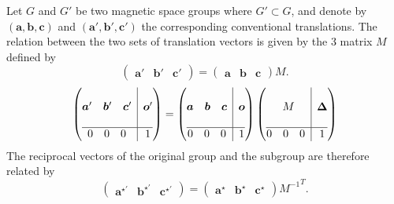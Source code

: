 \documentclass[12pt, a4paper]{article}
\begin{document}
Let $G$ and $G'$ be two magnetic space groups where $G'\subset G$, and denote by $(\bm{a},\bm{b},\bm{c})$ and $(\bm{a}',\bm{b}',\bm{c}')$ the corresponding conventional translations. The relation between the two sets of translation vectors is given by the 3 matrix $M$ defined by
\begin{equation}
  \begin{pmatrix}
    \bm{a}'&\bm{b}'&\bm{c}'
  \end{pmatrix}
  =
  \begin{pmatrix}
    \bm{a}&\bm{b}&\bm{c}
  \end{pmatrix}
  M.
\end{equation} 
\begin{equation}
  \left(
  \begin{array}{@{}c|c@{}}
    \begin{matrix}
      \phantom{0}&& \\
      \bm{a}'&\bm{b}'&\bm{c}' \\
      \phantom{0}&& 
    \end{matrix}&\bm{o}'\\
    \hline
    \begin{matrix}
      0&0&0
    \end{matrix}&1
  \end{array}
  \right)
  =
  \left(
  \begin{array}{@{}c|c@{}}
    \begin{matrix}
      \phantom{0}&& \\
      \bm{a}&\bm{b}&\bm{c} \\
      \phantom{0}&& 
    \end{matrix}&\bm{o}\\
    \hline
    \begin{matrix}
      0&0&0
    \end{matrix}&1
  \end{array}
  \right)
  \left(
  \begin{array}{@{}c|c@{}}
    \begin{matrix}
      \phantom{0}&& \\
      &M& \\
      \phantom{0}&& 
    \end{matrix}&\bm{\Delta}\\
    \hline
    \begin{matrix}
      0&0&0
    \end{matrix}&1
  \end{array}
  \right)
\end{equation} 
The reciprocal vectors of the original group and the subgroup are therefore related by
\begin{equation}
  \begin{pmatrix}
    \bm{a}^{\star\prime}&\bm{b}^{\star\prime}&\bm{c}^{\star\prime}
  \end{pmatrix}
  =
  \begin{pmatrix}
    \bm{a}^\star&\bm{b}^\star&\bm{c}^\star
  \end{pmatrix}
  {M^{-1}}^{T}.
\end{equation} 
\end{document}
